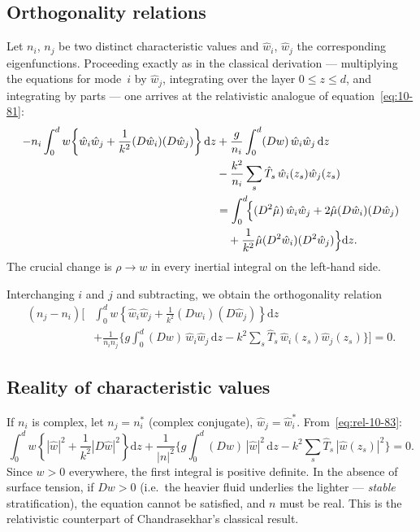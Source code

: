 \subsection{Orthogonality relations}

Let $n_{i}$, $n_{j}$ be two distinct characteristic values and
$\hat{w}_{i}$, $\hat{w}_{j}$ the corresponding eigenfunctions.
Proceeding exactly as in the classical derivation --- multiplying the
equations for mode~$i$ by $\hat{w}_{j}$, integrating over the layer
$0 \leqslant z \leqslant d$, and integrating by parts --- one arrives
at the relativistic analogue of equation~\eqref{eq:10-81}:
\begin{align}\label{eq:rel-10-81}
  -n_{i}\int_{0}^{d} w\!\left\{\hat{w}_{i}\hat{w}_{j}
  + \frac{1}{k^{2}}(D\hat{w}_{i})(D\hat{w}_{j})\right\}\mathrm{d}z
  &+ \frac{g}{n_{i}}\int_{0}^{d}(Dw)\,\hat{w}_{i}\hat{w}_{j}\,
    \mathrm{d}z
  \nonumber\\
  &- \frac{k^{2}}{n_{i}}\sum_{s}\hat{T}_{s}\,
    \hat{w}_{i}(z_{s})\hat{w}_{j}(z_{s})
  \nonumber\\
  &= \int_{0}^{d}\!\Bigl\{(D^{2}\hat{\mu})\,\hat{w}_{i}\hat{w}_{j}
  + 2\hat{\mu}(D\hat{w}_{i})(D\hat{w}_{j})
  \nonumber\\
  &\quad
  + \frac{1}{k^{2}}\hat{\mu}(D^{2}\hat{w}_{i})
    (D^{2}\hat{w}_{j})\Bigr\}\mathrm{d}z.
\end{align}
The crucial change is $\rho \to w$ in every inertial integral on the
left-hand side.

Interchanging $i$ and $j$ and subtracting, we obtain the orthogonality
relation
\begin{align}\label{eq:rel-10-83}
  (n_{j} - n_{i})\!\Biggl[
  &\int_{0}^{d} w\!\left\{\hat{w}_{i}\hat{w}_{j}
  + \frac{1}{k^{2}}(D\hat{w}_{i})(D\hat{w}_{j})\right\}\mathrm{d}z
  \nonumber\\
  &+ \frac{1}{n_{i}n_{j}}\biggl\{
    g\int_{0}^{d}(Dw)\,\hat{w}_{i}\hat{w}_{j}\,\mathrm{d}z
    - k^{2}\sum_{s}\hat{T}_{s}\,\hat{w}_{i}(z_{s})
      \hat{w}_{j}(z_{s})\biggr\}
  \Biggr] = 0.
\end{align}

\subsection{Reality of characteristic values}

If $n_{i}$ is complex, let $n_{j} = n_{i}^{*}$ (complex conjugate),
$\hat{w}_{j} = \hat{w}_{i}^{*}$.  From~\eqref{eq:rel-10-83}:
\begin{equation}\label{eq:rel-10-86}
  \int_{0}^{d} w\!\left\{|\hat{w}|^{2}
  + \frac{1}{k^{2}}|D\hat{w}|^{2}\right\}\mathrm{d}z
  + \frac{1}{|n|^{2}}\biggl\{
    g\int_{0}^{d}(Dw)\,|\hat{w}|^{2}\,\mathrm{d}z
    - k^{2}\sum_{s}\hat{T}_{s}\,|\hat{w}(z_{s})|^{2}
  \biggr\} = 0.
\end{equation}
Since $w > 0$ everywhere, the first integral is positive definite.  In
the absence of surface tension, if $Dw > 0$ (i.e.\ the heavier fluid
underlies the lighter --- \emph{stable} stratification), the equation
cannot be satisfied, and $n$ must be real.  This is the relativistic
counterpart of Chandrasekhar's classical result.

